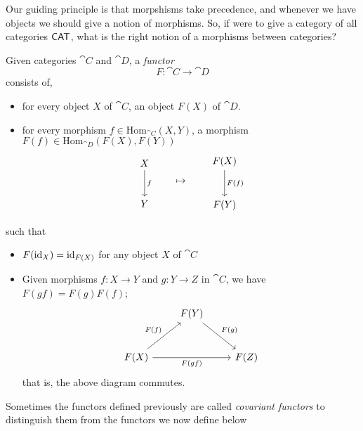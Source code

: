 
Our guiding principle is that morpshisms take precedence, and whenever we have objects we should give a notion of morphisms. So, if were to give a category of all categories $\mathsf{CAT}$, what is the right notion of a morphisms between categories?

\vspace*{0.1in}

\begin{definition}[Functors]\label{funcdefn}
Given categories $\cat{C}$ and $\cat{D}$, a \emph{functor}
\[F:\cat{C} \to \cat{D}\]
consists of,
\begin{itemize}
\item for every object $X$ of $\cat{C}$, an object $F(X)$ of $\cat{D}$.
\item for every morphism $f \in \mathrm{Hom}_{\cat{C}}(X,Y)$, a morphism $F(f) \in \mathrm{Hom}_{\cat{D}}(F(X),F(Y))$
\[\begin{tikzcd}[row sep=large]
X \arrow[d,"f"] \\
Y          
\end{tikzcd}\qquad \mapsto \qquad \begin{tikzcd}[row sep=large]
F(X) \arrow[d,"F(f)"] \\
F(Y)          
\end{tikzcd}\]
\end{itemize}
such that
\begin{itemize}
\item $F(\operatorname{id}_X) = \operatorname{id}_{F(X)}$ for any object $X$ of $\cat{C}$
\item Given morphisms $f:X \to Y$ and $g: Y \to Z$ in $\cat{C}$, we have $F(gf) = F(g)F(f)$;
\[\begin{tikzcd}[row sep=large]
                                             & F(Y) \arrow[rd, "F(g)"] &      \\
F(X) \arrow[ru, "F(f)"] \arrow[rr, "F(gf)"'] &                         & F(Z)
\end{tikzcd}\]
that is, the above diagram commutes.
\end{itemize}
\end{definition}

\vspace*{0.3in}

Sometimes the functors defined previously are called \emph{covariant functors} to distinguish them from the functors we now define below

